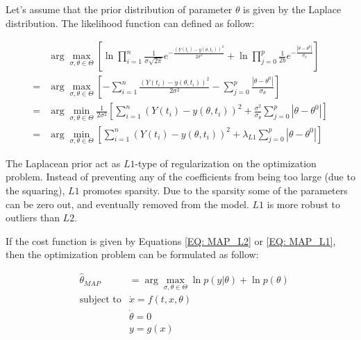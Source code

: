 \documentclass[../Article_Model_Parameters.tex]{subfiles}
\begin{document}
		Let's assume that the prior distribution of parameter $\theta$ is given by the Laplace distribution. The likelihood function can defined as follow:
		
		{\footnotesize
			\begin{equation} \label{EQ: MAP_L1}
				\begin{aligned}
					&\arg\max_{\sigma, \theta \in \Theta} \left[ \ln \prod_{i=1}^{n} \frac{1}{\sigma\sqrt{2\pi}}e^{-\frac{ \left( Y(t_i) - y\left( \theta, t_i \right) \right)^2 }{2\sigma^2}}
					+ \ln \prod_{j=0}^{p} \frac{1}{2b}e^{-\frac{ | \theta - \theta^0 | }{\sigma_\theta}} \right]  \\
					= &\arg\max_{\sigma, \theta \in \Theta} \left[- \sum_{i=1}^{n} {\frac{\left( Y(t_i) - y\left( \theta, t_i \right) \right)^2}{2\sigma^2}}
					- \sum_{j=0}^{p} {\frac{ | \theta - \theta^0 | }{\sigma_\theta}} \right]\\
					= &\arg\min_{\sigma, \theta \in \Theta} \frac{1}{2\sigma^2} \left[ \sum_{i=1}^{n} \left( Y(t_i) - y\left( \theta, t_i \right) \right)^2
					+ \frac{\sigma^2}{\sigma_\theta} \sum_{j=0}^{p} | \theta - \theta^0 | \right] \\
					= &\arg\min_{\sigma, \theta \in \Theta} \left[ \sum_{i=1}^{n} \left( Y(t_i) - y\left( \theta, t_i \right) \right)^2 + \lambda_{L1} \sum_{j=0}^{p} | \theta - \theta^0 | \right]
				\end{aligned}
		\end{equation} }
		
		The Laplacean prior act as $L1$-type of regularization on the optimization problem. Instead of preventing any of the coefficients from being too large (due to the squaring), $L1$ promotes sparsity. Due to the sparsity some of the parameters can be zero out, and eventually removed from the model. $L1$ is more robust to outliers than $L2$. 
		
		If the cost function is given by Equations \ref{EQ: MAP_L2} or \ref{EQ: MAP_L1}, then the optimization problem can be formulated as follow:
		
		{\footnotesize
			\begin{equation}
				\begin{aligned}
					&\hat{\theta}_{MAP} &= \arg\max_{\sigma, \theta \in \Theta} \ln p(y | \theta) + \ln p(\theta) \\
					&\text{subject to}
					& \dot{x} = f(t,x,\theta) \\
					&& \dot{\theta} = 0 \\
					&& y = g(x)
				\end{aligned}
		\end{equation} }
		
\end{document}
